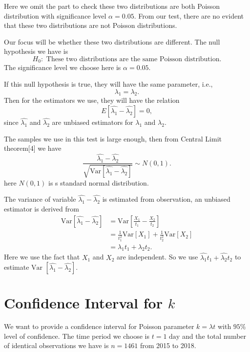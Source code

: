 \documentclass[11pt,a4paper,english]{article}
\begin{document}
Here we omit the part to check these two distributions are both Poisson distribution with significance level $\alpha = 0.05$. From our test, there are no evident that these two distributions are not Poisson distributions.

Our focus will be whether these two distributions are different. The null hypothesis we have is 
\begin{equation*}
	H_{0}:\text{ These two distributions are the same Poisson distribution.}
\end{equation*}
The significance level we choose here is $\alpha = 0.05$.

If this null hypothesis is true, they will have the same parameter, i.e.,
\begin{equation*}
	\lambda_{1} = \lambda_{2}.
\end{equation*}
Then for the estimators we use, they will have the relation
\begin{equation*}
	E[\hat{\lambda_{1}}-\hat{\lambda_{2}}] = 0,
\end{equation*}
since $\hat{\lambda_{1}}$ and $\hat{\lambda_{2}}$ are unbiased estimators for $\lambda_{1}$ and $\lambda_{2}$.

The samples we use in this test is large enough, then from Central Limit theorem[4] we have
\begin{equation*}
	\frac{\hat{\lambda_{1}} - \hat{\lambda_{2}}}{\sqrt{\text{Var}\left[\hat{\lambda_{1}} - \hat{\lambda_{2}}\right]}}
	\sim N(0, 1).
\end{equation*}
here $N(0,1)$ is s standard normal distribution.

The variance of variable $\hat{\lambda_{1}}-\hat{\lambda_{2}}$ is estimated from observation, an unbiased estimator is derived from
\begin{align*}
	\text{Var}\left[\hat{\lambda_{1}} - \hat{\lambda_{2}}\right]
	&= \text{Var}\left[\frac{X_{1}}{t_{1}} - \frac{X_{2}}{t_{2}}\right] \\
	&= \frac{1}{t_{1}^{2}}\text{Var}[X_{1}]
	+ \frac{1}{t_{2}^{2}}\text{Var}[X_{2}] \\
	&= \lambda_{1} t_{1} + \lambda_{2} t_{2}.
\end{align*}
Here we use the fact that $X_{1}$ and $X_{2}$ are independent. So we use $\hat{\lambda_{1}}t_{1}+\hat{\lambda_{2}}t_{2}$ to estimate $\text{Var }\left[\hat{\lambda_{1}}-\hat{\lambda_{2}}\right]$.

\section{Confidence Interval for $k$}
We want to provide a confidence interval for Poisson parameter $k = \lambda t$ with $95\%$ level of confidence. 
The time period we choose is $t = 1\text{ day}$ and the total number of identical observations we have is $n = 1461$ from 2015 to 2018.
\end{document}
